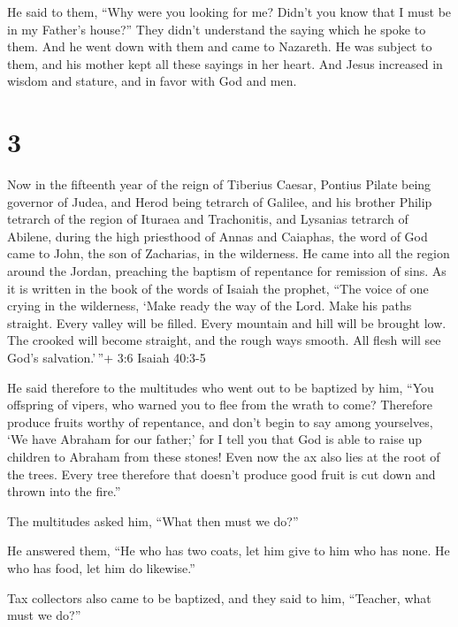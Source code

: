  He said to them, ``Why were you looking for me? Didn't you
know that I must be in my Father's house?''  They didn't
understand the saying which he spoke to them.  And he went
down with them and came to Nazareth. He was subject to them, and his
mother kept all these sayings in her heart.  And Jesus
increased in wisdom and stature, and in favor with God and men.

\hypertarget{section-2}{%
\section{3}\label{section-2}}

 Now in the fifteenth year of the reign of Tiberius Caesar,
Pontius Pilate being governor of Judea, and Herod being tetrarch of
Galilee, and his brother Philip tetrarch of the region of Ituraea and
Trachonitis, and Lysanias tetrarch of Abilene,  during the
high priesthood of Annas and Caiaphas, the word of God came to John, the
son of Zacharias, in the wilderness.  He came into all the
region around the Jordan, preaching the baptism of repentance for
remission of sins.  As it is written in the book of the
words of Isaiah the prophet, ``The voice of one crying in the
wilderness, `Make ready the way of the Lord. Make his paths straight.
 Every valley will be filled. Every mountain and hill will
be brought low. The crooked will become straight, and the rough ways
smooth.  All flesh will see God's salvation.'\,''+ 3:6
Isaiah 40:3-5

 He said therefore to the multitudes who went out to be
baptized by him, ``You offspring of vipers, who warned you to flee from
the wrath to come?  Therefore produce fruits worthy of
repentance, and don't begin to say among yourselves, `We have Abraham
for our father;' for I tell you that God is able to raise up children to
Abraham from these stones!  Even now the ax also lies at the
root of the trees. Every tree therefore that doesn't produce good fruit
is cut down and thrown into the fire.''

 The multitudes asked him, ``What then must we do?''

 He answered them, ``He who has two coats, let him give to
him who has none. He who has food, let him do likewise.''

 Tax collectors also came to be baptized, and they said to
him, ``Teacher, what must we do?''

